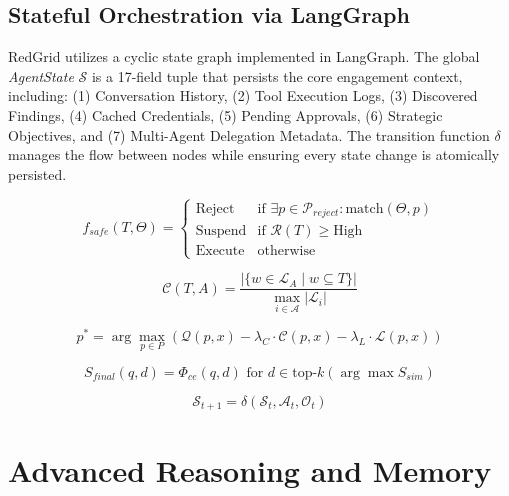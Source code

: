 \documentclass[conference]{IEEEtran}
\begin{document}
\subsection{Stateful Orchestration via LangGraph}
RedGrid utilizes a cyclic state graph implemented in LangGraph. The global \textit{AgentState} $\mathcal{S}$ is a 17-field tuple that persists the core engagement context, including: (1) Conversation History, (2) Tool Execution Logs, (3) Discovered Findings, (4) Cached Credentials, (5) Pending Approvals, (6) Strategic Objectives, and (7) Multi-Agent Delegation Metadata. The transition function $\delta$ manages the flow between nodes while ensuring every state change is atomically persisted.

\begin{equation} \label{eq:safety_gate}
f_{safe}(T, \Theta) = 
\begin{cases} 
\text{Reject} & \text{if } \exists p \in \mathcal{P}_{reject} : \text{match}(\Theta, p) \\
\text{Suspend} & \text{if } \mathcal{R}(T) \geq \text{High} \\
\text{Execute} & \text{otherwise}
\end{cases}
\end{equation}

\begin{equation} \label{eq:routing_confidence}
\mathcal{C}(T, A) = \frac{|\{ w \in \mathcal{L}_A \mid w \subseteq T \}|}{\max_{i \in \mathcal{A}} |\mathcal{L}_i|}
\end{equation}

\begin{equation} \label{eq:routing_opt}
p^* = \arg \max_{p \in P} \left( \mathcal{Q}(p, x) - \lambda_C \cdot \mathcal{C}(p, x) - \lambda_L \cdot \mathcal{L}(p, x) \right)
\end{equation}

\begin{equation} \label{eq:rag_final}
S_{final}(q, d) = \Phi_{ce}(q, d) \text{ for } d \in \text{top-}k(\arg \max S_{sim})
\end{equation}

\begin{equation} \label{eq:state_transition}
\mathcal{S}_{t+1} = \delta(\mathcal{S}_t, \mathcal{A}_t, \mathcal{O}_t)
\end{equation}

\section{Advanced Reasoning and Memory}
\label{sec:reasoning}
\end{document}
